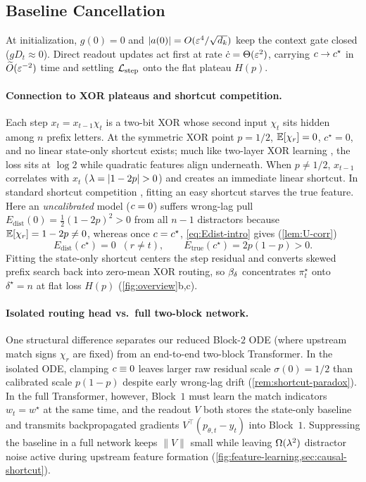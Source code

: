 \subsection{Baseline Cancellation}
\label{sec:what-calibration-buys}

At initialization, $g(0) = 0$ and $|a(0)| = O(\varepsilon^4/\sqrt{d_k})$ keep the context gate closed ($g D_t \approx 0$). Direct readout updates act first at rate $\dot{c} = \Theta(\varepsilon^2)$, carrying $c \to c^\star$ in $\widetilde O(\varepsilon^{-2})$ time and settling $\mathcal L_{\mathrm{step}}$ onto the flat plateau $H(p)$.

\paragraph{Connection to XOR plateaus and shortcut competition.}
Each step $x_t = x_{t-1}\chi_t$ is a two-bit XOR whose second input $\chi_t$ sits hidden among $n$ prefix letters. At the symmetric XOR point $p = 1/2$, $\mathbb E[\chi_r] = 0$, $c^\star = 0$, and no linear state-only shortcut exists; much like two-layer XOR learning \citep{glasgow2024sgd}, the loss sits at $\log 2$ while quadratic features align underneath. When $p \ne 1/2$, $x_{t-1}$ correlates with $x_t$ ($\lambda = |1-2p| > 0$) and creates an immediate linear shortcut. In standard shortcut competition \citep{labonte2026shortcut}, fitting an easy shortcut starves the true feature. Here an \emph{uncalibrated} model ($c = 0$) suffers wrong-lag pull $E_{\mathrm{dist}}(0) = \frac{1}{2}(1-2p)^2 > 0$ from all $n-1$ distractors because $\mathbb E[\chi_r] = 1 - 2p \ne 0$, whereas once $c = c^\star$, \cref{eq:Edist-intro} gives (\cref{lem:U-corr})
\[
  E_{\mathrm{dist}}(c^\star) = 0 \;\; (r \ne t),
  \qquad
  E_{\mathrm{true}}(c^\star) = 2p(1-p) > 0.
\]
Fitting the state-only shortcut centers the step residual and converts skewed prefix search back into zero-mean XOR routing, so $\beta_\delta$ concentrates $\pi_t^\star$ onto $\delta^\star = n$ at flat loss $H(p)$ (\cref{fig:overview}b,c).

\paragraph{Isolated routing head vs.\ full two-block network.}
One structural difference separates our reduced Block-$2$ ODE (where upstream match signs $\chi_r$ are fixed) from an end-to-end two-block Transformer. In the isolated ODE, clamping $c \equiv 0$ leaves larger raw residual scale $\sigma(0)=1/2$ than calibrated scale $p(1-p)$ despite early wrong-lag drift (\cref{rem:shortcut-paradox}). In the full Transformer, however, Block~$1$ must learn the match indicators $w_t = w^\star$ at the same time, and the readout $V$ both stores the state-only baseline and transmits backpropagated gradients $V^\top(p_{\theta,t} - y_t)$ into Block~$1$. Suppressing the baseline in a full network keeps $\|V\|$ small while leaving $\Omega(\lambda^2)$ distractor noise active during upstream feature formation (\cref{fig:feature-learning,sec:causal-shortcut}).

